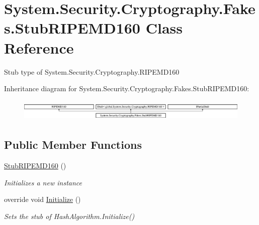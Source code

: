 \hypertarget{class_system_1_1_security_1_1_cryptography_1_1_fakes_1_1_stub_r_i_p_e_m_d160}{\section{System.\-Security.\-Cryptography.\-Fakes.\-Stub\-R\-I\-P\-E\-M\-D160 Class Reference}
\label{class_system_1_1_security_1_1_cryptography_1_1_fakes_1_1_stub_r_i_p_e_m_d160}
}


Stub type of System.\-Security.\-Cryptography.\-R\-I\-P\-E\-M\-D160 


Inheritance diagram for System.\-Security.\-Cryptography.\-Fakes.\-Stub\-R\-I\-P\-E\-M\-D160\-:\begin{figure}[H]
\begin{center}
\leavevmode
\includegraphics[height=1.051643cm]{class_system_1_1_security_1_1_cryptography_1_1_fakes_1_1_stub_r_i_p_e_m_d160}
\end{center}
\end{figure}
\subsection*{Public Member Functions}
\begin{DoxyCompactItemize}
\item 
\hyperlink{class_system_1_1_security_1_1_cryptography_1_1_fakes_1_1_stub_r_i_p_e_m_d160_ac9d68657ef412cd59c890c80a4ac6997}{Stub\-R\-I\-P\-E\-M\-D160} ()
\begin{DoxyCompactList}\small\item\em Initializes a new instance\end{DoxyCompactList}\item 
override void \hyperlink{class_system_1_1_security_1_1_cryptography_1_1_fakes_1_1_stub_r_i_p_e_m_d160_ab731622d666c233ed1cef5b526843dae}{Initialize} ()
\begin{DoxyCompactList}\small\item\em Sets the stub of Hash\-Algorithm.\-Initialize()\end{DoxyCompactList}\end{DoxyCompactItemize}

